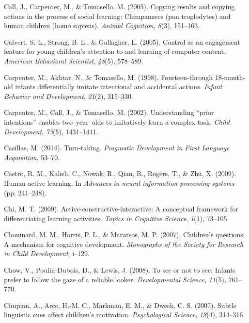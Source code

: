 \documentclass[english,floatsintext,man]{apa6}
\theoremstyle{definition}
\theoremstyle{definition}
\theoremstyle{definition}
\theoremstyle{remark}
\begin{document}
\hypertarget{ref-call2005copying}{}
Call, J., Carpenter, M., \& Tomasello, M. (2005). Copying results and
copying actions in the process of social learning: Chimpanzees (pan
troglodytes) and human children (homo sapiens). \emph{Animal Cognition},
\emph{8}(3), 151--163.

\hypertarget{ref-calvert2005control}{}
Calvert, S. L., Strong, B. L., \& Gallagher, L. (2005). Control as an
engagement feature for young children's attention to and learning of
computer content. \emph{American Behavioral Scientist}, \emph{48}(5),
578--589.

\hypertarget{ref-carpenter1998fourteen}{}
Carpenter, M., Akhtar, N., \& Tomasello, M. (1998). Fourteen-through
18-month-old infants differentially imitate intentional and accidental
actions. \emph{Infant Behavior and Development}, \emph{21}(2), 315--330.

\hypertarget{ref-carpenter2002understanding}{}
Carpenter, M., Call, J., \& Tomasello, M. (2002). Understanding ``prior
intentions'' enables two--year--olds to imitatively learn a complex
task. \emph{Child Development}, \emph{73}(5), 1431--1441.

\hypertarget{ref-casillas2014turn}{}
Casillas, M. (2014). Turn-taking. \emph{Pragmatic Development in First
Language Acquisition}, 53--70.

\hypertarget{ref-castro2009human}{}
Castro, R. M., Kalish, C., Nowak, R., Qian, R., Rogers, T., \& Zhu, X.
(2009). Human active learning. In \emph{Advances in neural information
processing systems} (pp. 241--248).

\hypertarget{ref-chi2009active}{}
Chi, M. T. (2009). Active-constructive-interactive: A conceptual
framework for differentiating learning activities. \emph{Topics in
Cognitive Science}, \emph{1}(1), 73--105.

\hypertarget{ref-chouinard2007children}{}
Chouinard, M. M., Harris, P. L., \& Maratsos, M. P. (2007). Children's
questions: A mechanism for cognitive development. \emph{Monographs of
the Society for Research in Child Development}, i--129.

\hypertarget{ref-chow2008see}{}
Chow, V., Poulin-Dubois, D., \& Lewis, J. (2008). To see or not to see:
Infants prefer to follow the gaze of a reliable looker.
\emph{Developmental Science}, \emph{11}(5), 761--770.

\hypertarget{ref-cimpian2007subtle}{}
Cimpian, A., Arce, H.-M. C., Markman, E. M., \& Dweck, C. S. (2007).
Subtle linguistic cues affect children's motivation. \emph{Psychological
Science}, \emph{18}(4), 314--316.
\end{document}
